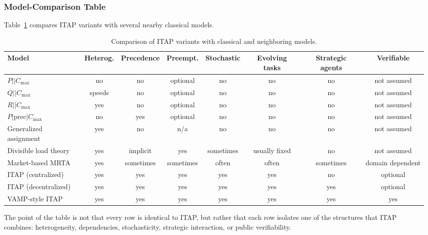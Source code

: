 \subsubsection{Model-Comparison Table}

Table~\ref{tab:itap-model-comparison} compares ITAP variants with several nearby classical models.

\begin{table}[t]
\centering
\small
\begin{tabular}{lccccccc}
\hline
Model & Heterog. & Precedence & Preempt. & Stochastic & Evolving tasks & Strategic agents & Verifiable \\
\hline
\(P||C_{\max}\) & no & no & optional & no & no & no & not assumed \\
\(Q||C_{\max}\) & speeds & no & optional & no & no & no & not assumed \\
\(R||C_{\max}\) & yes & no & optional & no & no & no & not assumed \\
\(P|\mathrm{prec}|C_{\max}\) & no & yes & optional & no & no & no & not assumed \\
Generalized assignment & yes & no & n/a & no & no & no & not assumed \\
Divisible load theory & yes & implicit & yes & sometimes & usually fixed & no & not assumed \\
Market-based MRTA & yes & sometimes & sometimes & often & often & sometimes & domain dependent \\
\hline
ITAP (centralized) & yes & yes & yes & yes & yes & no & optional \\
ITAP (decentralized) & yes & yes & yes & yes & yes & yes & optional \\
VAMP-style ITAP & yes & yes & yes & yes & yes & yes & yes \\
\hline
\end{tabular}
\caption{Comparison of ITAP variants with classical and neighboring models.}
\label{tab:itap-model-comparison}
\end{table}

The point of the table is not that every row is identical to ITAP, but rather that each row isolates one of the structures that ITAP combines: heterogeneity, dependencies, stochasticity, strategic interaction, or public verifiability.
